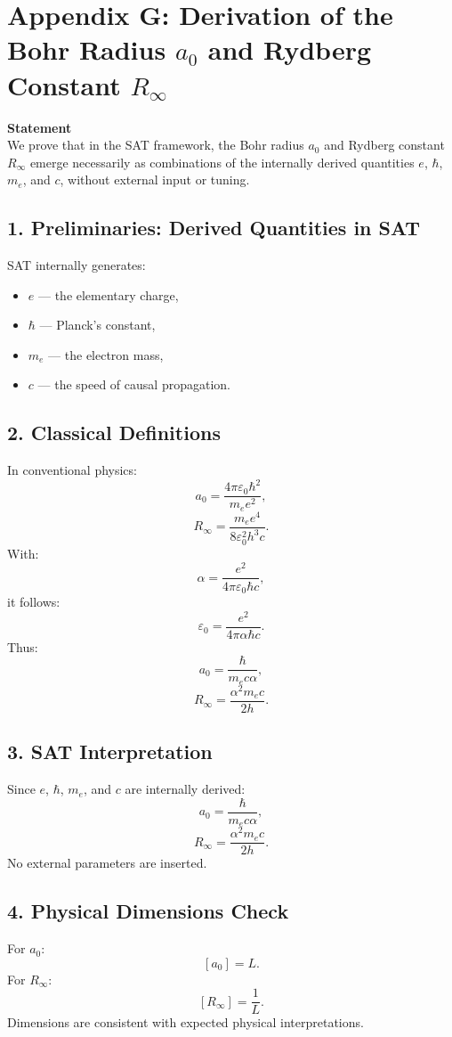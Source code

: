\documentclass[12pt]{article}
\begin{document}
\newpage
\section*{Appendix G: Derivation of the Bohr Radius \(a_0\) and Rydberg Constant \(R_\infty\)}

\textbf{Statement} \\
We prove that in the SAT framework, the Bohr radius \(a_0\) and Rydberg constant \(R_\infty\) emerge necessarily as combinations of the internally derived quantities \(e\), \(\hbar\), \(m_e\), and \(c\), without external input or tuning.

\subsection*{1. Preliminaries: Derived Quantities in SAT}
SAT internally generates:
\begin{itemize}
    \item \(e\) — the elementary charge,
    \item \(\hbar\) — Planck’s constant,
    \item \(m_e\) — the electron mass,
    \item \(c\) — the speed of causal propagation.
\end{itemize}

\subsection*{2. Classical Definitions}
In conventional physics:
\[
a_0 = \frac{4\pi \varepsilon_0 \hbar^2}{m_e e^2},
\]
\[
R_\infty = \frac{m_e e^4}{8 \varepsilon_0^2 h^3 c}.
\]
With:
\[
\alpha = \frac{e^2}{4\pi \varepsilon_0 \hbar c},
\]
it follows:
\[
\varepsilon_0 = \frac{e^2}{4\pi \alpha \hbar c}.
\]
Thus:
\[
a_0 = \frac{\hbar}{m_e c \alpha},
\]
\[
R_\infty = \frac{\alpha^2 m_e c}{2 h}.
\]

\subsection*{3. SAT Interpretation}
Since \(e\), \(\hbar\), \(m_e\), and \(c\) are internally derived:
\[
a_0 = \frac{\hbar}{m_e c \alpha},
\]
\[
R_\infty = \frac{\alpha^2 m_e c}{2 h}.
\]
No external parameters are inserted.

\subsection*{4. Physical Dimensions Check}
For \(a_0\):
\[
[a_0] = L.
\]
For \(R_\infty\):
\[
[R_\infty] = \frac{1}{L}.
\]
Dimensions are consistent with expected physical interpretations.
\end{document}
